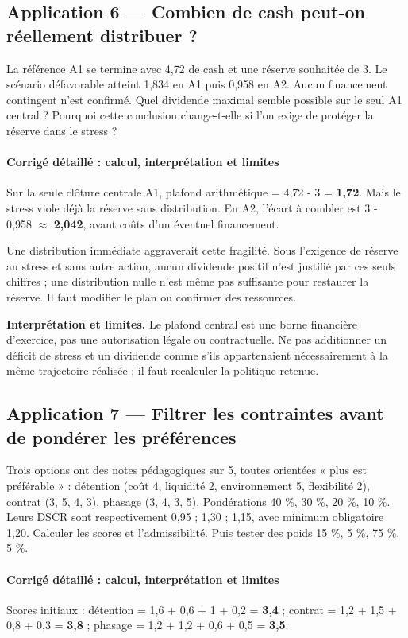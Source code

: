 \documentclass[12pt,a4paper]{article}
\begin{document}
\subsection*{Application 6 --- Combien de cash peut-on réellement distribuer ?}
La référence A1 se termine avec 4,72 de cash et une réserve souhaitée de 3. Le scénario défavorable atteint 1,834 en A1 puis 0,958 en A2. Aucun financement contingent n’est confirmé. Quel dividende maximal semble possible sur le seul A1 central ? Pourquoi cette conclusion change-t-elle si l’on exige de protéger la réserve dans le stress ?


\paragraph{Corrigé détaillé : calcul, interprétation et limites}
Sur la seule clôture centrale A1, plafond arithmétique = 4,72 - 3 = \textbf{1,72}. Mais le stress viole déjà la réserve sans distribution. En A2, l’écart à combler est 3 - 0,958 $\approx$ \textbf{2,042}, avant coûts d’un éventuel financement.

Une distribution immédiate aggraverait cette fragilité. Sous l’exigence de réserve au stress et sans autre action, aucun dividende positif n’est justifié par ces seuls chiffres ; une distribution nulle n’est même pas suffisante pour restaurer la réserve. Il faut modifier le plan ou confirmer des ressources.

\textbf{Interprétation et limites.} Le plafond central est une borne financière d’exercice, pas une autorisation légale ou contractuelle. Ne pas additionner un déficit de stress et un dividende comme s’ils appartenaient nécessairement à la même trajectoire réalisée ; il faut recalculer la politique retenue.


\subsection*{Application 7 --- Filtrer les contraintes avant de pondérer les préférences}
Trois options ont des notes pédagogiques sur 5, toutes orientées « plus est préférable » : détention (coût 4, liquidité 2, environnement 5, flexibilité 2), contrat (3, 5, 4, 3), phasage (3, 4, 3, 5). Pondérations 40 \%, 30 \%, 20 \%, 10 \%. Leurs DSCR sont respectivement 0,95 ; 1,30 ; 1,15, avec minimum obligatoire 1,20. Calculer les scores et l’admissibilité. Puis tester des poids 15 \%, 5 \%, 75 \%, 5 \%.


\paragraph{Corrigé détaillé : calcul, interprétation et limites}
Scores initiaux : détention = 1,6 + 0,6 + 1 + 0,2 = \textbf{3,4} ; contrat = 1,2 + 1,5 + 0,8 + 0,3 = \textbf{3,8} ; phasage = 1,2 + 1,2 + 0,6 + 0,5 = \textbf{3,5}.
\end{document}
